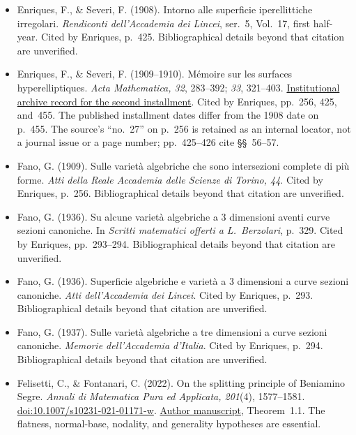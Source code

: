 \begin{sloppypar}
\begin{itemize}
\item Enriques, F., \& Severi, F. (1908). Intorno alle superficie iperellittiche irregolari. \emph{Rendiconti dell'Accademia dei Lincei}, ser.~5, Vol.~17, first half-year. Cited by Enriques, p.~425. Bibliographical details beyond that citation are unverified.

\item Enriques, F., \& Severi, F. (1909--1910). Mémoire sur les surfaces hyperelliptiques. \emph{Acta Mathematica, 32}, 283--392; \emph{33}, 321--403. \href{https://archive.ymsc.tsinghua.edu.cn/pacm_paperurl/20170108203023008561205}{Institutional archive record for the second installment}. Cited by Enriques, pp.~256, 425, and~455. The published installment dates differ from the 1908 date on p.~455. The source's ``no.~27'' on p.~256 is retained as an internal locator, not a journal issue or a page number; pp.~425--426 cite \S\S~56--57.

\item Fano, G. (1909). Sulle varietà algebriche che sono intersezioni complete di più forme. \emph{Atti della Reale Accademia delle Scienze di Torino, 44}. Cited by Enriques, p.~256. Bibliographical details beyond that citation are unverified.

\item Fano, G. (1936). Su alcune varietà algebriche a 3 dimensioni aventi curve sezioni canoniche. In \emph{Scritti matematici offerti a L.~Berzolari}, p.~329. Cited by Enriques, pp.~293--294. Bibliographical details beyond that citation are unverified.

\item Fano, G. (1936). Superficie algebriche e varietà a 3 dimensioni a curve sezioni canoniche. \emph{Atti dell'Accademia dei Lincei}. Cited by Enriques, p.~293. Bibliographical details beyond that citation are unverified.

\item Fano, G. (1937). Sulle varietà algebriche a tre dimensioni a curve sezioni canoniche. \emph{Memorie dell'Accademia d'Italia}. Cited by Enriques, p.~294. Bibliographical details beyond that citation are unverified.

\item Felisetti, C., \& Fontanari, C. (2022). On the splitting principle of Beniamino Segre. \emph{Annali di Matematica Pura ed Applicata, 201}(4), 1577--1581. \href{https://doi.org/10.1007/s10231-021-01171-w}{doi:10.1007/s10231-021-01171-w}. \href{https://arxiv.org/abs/2105.00892}{Author manuscript}, Theorem~1.1. The flatness, normal-base, nodality, and generality hypotheses are essential.


\end{itemize}
\end{sloppypar}
